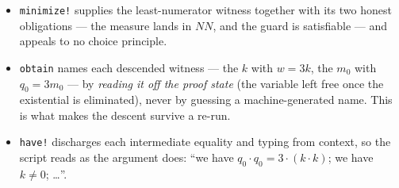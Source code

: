 \begin{itemize}
\item \texttt{minimize!} supplies the least-numerator witness together with its
  two honest obligations --- the measure lands in $\mathit{NN}$, and the guard
  is satisfiable --- and appeals to no choice principle.
\item \texttt{obtain} names each descended witness --- the $k$ with $w = 3k$,
  the $m_0$ with $q_0 = 3m_0$ --- by \emph{reading it off the proof state} (the
  variable left free once the existential is eliminated), never by guessing a
  machine-generated name.  This is what makes the descent survive a re-run.
\item \texttt{have!} discharges each intermediate equality and typing from
  context, so the script reads as the argument does: ``we have
  $q_0\cdot q_0 = 3\cdot(k\cdot k)$; we have $k \neq 0$; \ldots''.
\end{itemize}

